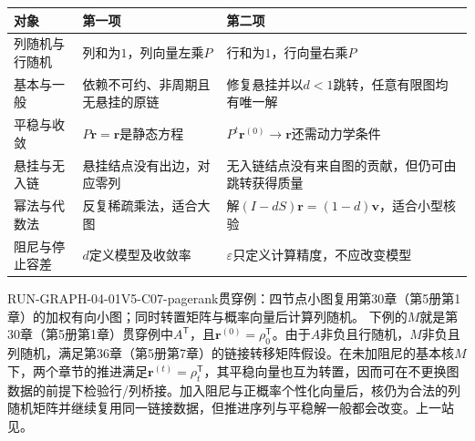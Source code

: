 \label{struct:V5-C07-CH31}
\begin{comparisonbox}
\small
\begin{tabularx}{\textwidth}{@{}p{}XX@{}}
\toprule
对象 & 第一项 & 第二项 \\
\midrule
列随机与行随机 & 列和为$1$，列向量左乘$P$ & 行和为$1$，行向量右乘$P$ \\
基本与一般\PageRank{} & 依赖不可约、非周期且无悬挂的原链 & 修复悬挂并以$d<1$跳转，任意有限图均有唯一解 \\
平稳与收敛 & $P\boldsymbol r=\boldsymbol r$是静态方程 & $P^t\boldsymbol r^{(0)}\to\boldsymbol r$还需动力学条件 \\
悬挂与无入链 & 悬挂结点没有出边，对应零列 & 无入链结点没有来自图的贡献，但仍可由跳转获得质量 \\
幂法与代数法 & 反复稀疏乘法，适合大图 & 解$(I-dS)\boldsymbol r=(1-d)\boldsymbol v$，适合小型核验 \\
阻尼与停止容差 & $d$定义模型及收敛率 & $\varepsilon$只定义计算精度，不应改变模型 \\
\bottomrule
\end{tabularx}
\end{comparisonbox}


\begin{SLRunningExample}{RUN-GRAPH-04-01}{V5-C07-pagerank}{贯穿例：四节点小图}{复用第30章（第5册第1章）的加权有向小图；同时转置矩阵与概率向量后计算列随机\PageRank{}。}
下例的$M$就是第30章（第5册第1章）贯穿例中$A^{\mathsf T}$，且$\boldsymbol r^{(0)}=\rho_0^{\mathsf T}$。由于$A$非负且行随机，$M$非负且列随机，满足第36章（第5册第7章）的链接转移矩阵假设。在未加阻尼的基本核$M$下，两个章节的推进满足$\boldsymbol r^{(t)}=\rho_t^{\mathsf T}$，其平稳向量也互为转置，因而可在不更换图数据的前提下检验行/列桥接。加入阻尼与正概率个性化向量后，\PageRank{}核仍为合法的列随机矩阵并继续复用同一链接数据，但推进序列与平稳解一般都会改变。上一站见。
\end{SLRunningExample}

